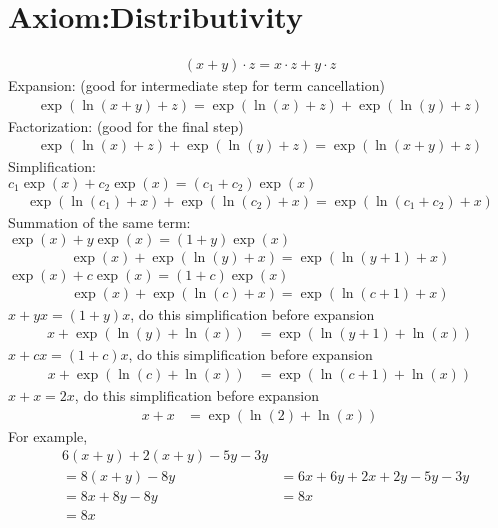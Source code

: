 \documentclass[12pt,a4paper]{report}
\begin{document}
\section{Axiom:Distributivity}
\label{Axiom:Distributivity}
\begin{align*}
(x+y) \cdot z = x \cdot z + y \cdot z
\end{align*}
Expansion: (good for intermediate step for term cancellation)
\begin{align}
\exp(\ln(x+y) + z) = \exp(\ln(x) + z) + \exp(\ln(y) + z) \label{Implementation:Expansion}
\end{align}
Factorization: (good for the final step)
\begin{align}
\exp(\ln(x) + z) + \exp(\ln(y) + z) = \exp(\ln(x+y) + z) \label{Implementation:Factorization}
\end{align}
Simplification: \\
$c_1 \exp(x) + c_2 \exp(x) = (c_1+c_2) \exp(x)$
\begin{align}
\exp(\ln(c_1) + x) + \exp(\ln(c_2) + x) = \exp(\ln(c_1+c_2) + x) \label{Implementation:Summation_of_Term_1}
\end{align}
Summation of the same term: \\
$\exp(x) + y \exp(x) = (1+y) \exp(x)$
\begin{align}
\exp(x) + \exp(\ln(y) + x) = \exp(\ln(y+1) + x) \label{Implementation:Summation_of_Term_2}
\end{align}
$\exp(x) + c \exp(x) = (1+c) \exp(x)$
\begin{align}
\exp(x) + \exp(\ln(c) + x) = \exp(\ln(c+1) + x) \label{Implementation:Summation_of_Term_3}
\end{align}
$x + y x = (1+y) x$, do this simplification before expansion
\begin{align}
x + \exp(\ln(y) + \ln(x)) &= \exp(\ln(y+1) + \ln(x)) \label{Implementation:Summation_of_Term_4}
\end{align}
$x + c x = (1+c) x$, do this simplification before expansion
\begin{align}
x + \exp(\ln(c) + \ln(x)) &= \exp(\ln(c+1) + \ln(x)) \label{Implementation:Summation_of_Term_5}
\end{align}
$x + x = 2x$, do this simplification before expansion
\begin{align}
x + x &= \exp(\ln(2) + \ln(x)) \label{Implementation:Summation_of_Term_6}
\end{align}
For example,
\begin{align*}
& 6(x+y) + 2(x+y) - 5y - 3y \\
&= 8(x+y)- 8y &= 6x +6y + 2x +2y - 5y - 3y \\
&=8x+8y-8y &= 8x \\
&=8x
\end{align*}
\end{document}
